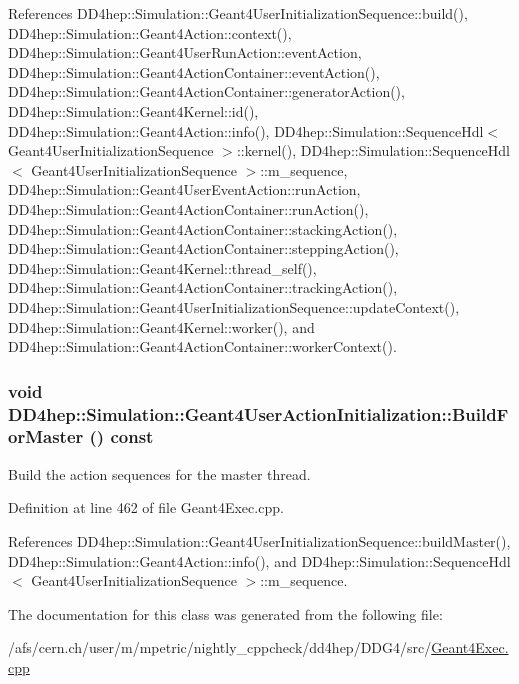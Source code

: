 References DD4hep::Simulation::Geant4UserInitializationSequence::build(), DD4hep::Simulation::Geant4Action::context(), DD4hep::Simulation::Geant4UserRunAction::eventAction, DD4hep::Simulation::Geant4ActionContainer::eventAction(), DD4hep::Simulation::Geant4ActionContainer::generatorAction(), DD4hep::Simulation::Geant4Kernel::id(), DD4hep::Simulation::Geant4Action::info(), DD4hep::Simulation::SequenceHdl$<$ Geant4UserInitializationSequence $>$::kernel(), DD4hep::Simulation::SequenceHdl$<$ Geant4UserInitializationSequence $>$::m\_\-sequence, DD4hep::Simulation::Geant4UserEventAction::runAction, DD4hep::Simulation::Geant4ActionContainer::runAction(), DD4hep::Simulation::Geant4ActionContainer::stackingAction(), DD4hep::Simulation::Geant4ActionContainer::steppingAction(), DD4hep::Simulation::Geant4Kernel::thread\_\-self(), DD4hep::Simulation::Geant4ActionContainer::trackingAction(), DD4hep::Simulation::Geant4UserInitializationSequence::updateContext(), DD4hep::Simulation::Geant4Kernel::worker(), and DD4hep::Simulation::Geant4ActionContainer::workerContext().\hypertarget{class_d_d4hep_1_1_simulation_1_1_geant4_user_action_initialization_afebdf3b3108fb471defe56bd6d8faf03}{
\subsubsection[{BuildForMaster}]{\setlength{\rightskip}{0pt plus 5cm}void DD4hep::Simulation::Geant4UserActionInitialization::BuildForMaster () const}}
\label{class_d_d4hep_1_1_simulation_1_1_geant4_user_action_initialization_afebdf3b3108fb471defe56bd6d8faf03}


Build the action sequences for the master thread. 

Definition at line 462 of file Geant4Exec.cpp.

References DD4hep::Simulation::Geant4UserInitializationSequence::buildMaster(), DD4hep::Simulation::Geant4Action::info(), and DD4hep::Simulation::SequenceHdl$<$ Geant4UserInitializationSequence $>$::m\_\-sequence.

The documentation for this class was generated from the following file:\begin{DoxyCompactItemize}
\item 
/afs/cern.ch/user/m/mpetric/nightly\_\-cppcheck/dd4hep/DDG4/src/\hyperlink{_geant4_exec_8cpp}{Geant4Exec.cpp}\end{DoxyCompactItemize}
